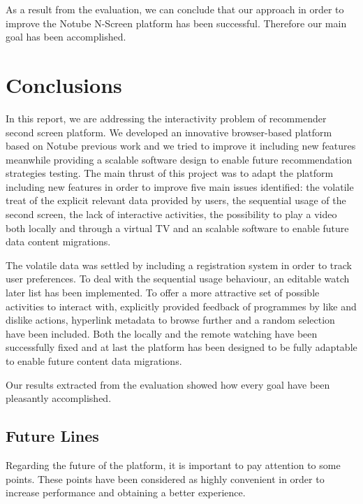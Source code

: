 \documentclass{acm_proc_article-sp}
\begin{document}
As a result from the evaluation, we can conclude that our approach in order to improve the Notube N-Screen platform has been successful. Therefore our main goal has been accomplished. 
\section{Conclusions}

In this report, we are addressing the interactivity problem of recommender second screen platform. We developed an innovative browser-based platform based on Notube previous work and we tried to improve it including new features meanwhile providing a scalable software design to enable future recommendation strategies testing. 
The main thrust of this project was to adapt the platform including new features in order to improve five main issues identified: the volatile treat of the explicit relevant data provided by users, the sequential usage of the second screen, the lack of interactive activities, the possibility to play a video both locally and through a virtual TV and an scalable software to enable future data content migrations. 

The volatile data was settled by including a registration system in order to track user preferences. To deal with the sequential usage behaviour, an editable watch later list has been implemented. To offer a more attractive set of possible activities to interact with, explicitly provided feedback of programmes by like and dislike actions, hyperlink metadata to browse further and a random selection have been included. Both the locally and the remote watching have been successfully fixed and at last the platform has been designed to be fully adaptable to enable future content data migrations.  

Our results extracted from the evaluation showed how every goal have been pleasantly accomplished. 

\subsection{Future Lines}

Regarding the future of the platform, it is important to pay attention to some points. These points have been considered as highly convenient in order to increase performance and obtaining a better experience.
\end{document}
